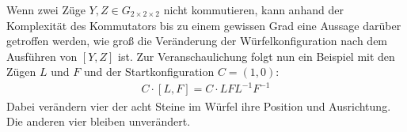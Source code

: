 \documentclass[12pt,a4paper, usenames, dvipsnames]{article}
\theoremstyle{mystyle}
\theoremstyle{definition}
\newcommand{\Gtwo}{\ensuremath{G_{2\times 2\times 2}}}
\begin{document}
Wenn zwei Züge $Y, Z \in \Gtwo$ nicht kommutieren, kann anhand der Komplexität des Kommutators bis zu einem gewissen Grad eine Aussage darüber getroffen werden, wie groß die Veränderung der Würfelkonfiguration nach dem Ausführen von $[Y, Z]$ ist. 
Zur Veranschaulichung folgt nun ein Beispiel mit den Zügen $L$ und $F$ und der Startkonfiguration $C = (1,0)$:
\begin{align*}
C \cdot  [L, F] = C \cdot LFL^{-1}F^{-1}
\end{align*}
Dabei verändern vier der acht Steine im Würfel ihre Position und Ausrichtung. Die anderen vier bleiben unverändert. 
%
%
%
%
%
%
%
\end{document}
